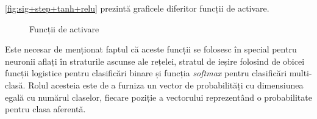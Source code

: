 \autoref{fig:sig+step+tanh+relu} prezintă graficele diferitor funcții de activare.
\begin{figure}[ht]
\centering
{}
\qquad
{}
\qquad
{}
\qquad
{}
\caption{Funcții de activare}\label{fig:sig+step+tanh+relu}
\end{figure}
Este necesar de menționat faptul că aceste funcții se folosesc în special pentru neuronii aflați în straturile ascunse ale rețelei, stratul de ieșire folosind de obicei funcții logistice pentru clasificări binare și funcția \textit{softmax} pentru clasificări multi-clasă. Rolul acesteia este de a furniza un vector de probabilități cu dimensiunea egală cu numărul claselor, fiecare poziție a vectorului reprezentând o probabilitate pentru clasa aferentă.

